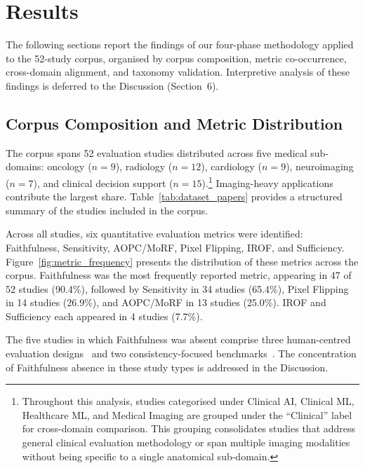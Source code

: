 \section{Results}

The following sections report the findings of our four-phase methodology applied
to the 52-study corpus, organised by corpus composition, metric co-occurrence,
cross-domain alignment, and taxonomy validation. Interpretive analysis of these
findings is deferred to the Discussion (Section~6).

\subsection{Corpus Composition and Metric Distribution}

The corpus spans 52 evaluation studies distributed across five medical
sub-domains: oncology ($n = 9$), radiology ($n = 12$), cardiology ($n = 9$),
neuroimaging ($n = 7$), and clinical decision support ($n =
15$).\footnote{Throughout this analysis, studies categorised under Clinical AI,
Clinical ML, Healthcare ML, and Medical Imaging are grouped under the
``Clinical'' label for cross-domain comparison. This grouping consolidates
studies that address general clinical evaluation methodology or span multiple
imaging modalities without being specific to a single anatomical sub-domain.}
Imaging-heavy applications contribute the largest share.
Table~\ref{tab:dataset_papers} provides a structured summary of the
studies included in the corpus.

Across all studies, six quantitative evaluation metrics were identified:
Faithfulness, Sensitivity, AOPC/MoRF, Pixel Flipping, IROF, and Sufficiency.
Figure~\ref{fig:metric_frequency} presents the distribution of these metrics
across the corpus. Faithfulness was the most frequently reported metric,
appearing in 47 of 52 studies (90.4\%), followed by Sensitivity in 34 studies
(65.4\%), Pixel Flipping in 14 studies (26.9\%), and AOPC/MoRF in 13 studies
(25.0\%). IROF and Sufficiency each appeared in 4 studies (7.7\%).

The five studies in which Faithfulness was absent comprise three human-centred
evaluation
designs~\cite{rezaeian2026explainability,finzel2024human,bauer2025human} and
two consistency-focused
benchmarks~\cite{qin2025consistency,alpsalaz2026explainability}. The
concentration of Faithfulness absence in these study types is addressed in
the Discussion.

